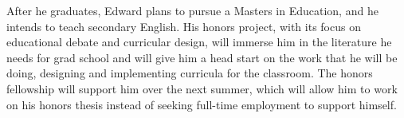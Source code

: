 \documentclass[doc,12pt]{apa6}
\begin{document}
After he graduates, Edward plans to pursue a Masters in Education, and he
intends to teach secondary English. His honors project, with its focus on
educational debate and curricular design, will immerse him in the literature he
needs for grad school and will give him a head start on the work that he will
be doing, designing and implementing curricula for the classroom. The honors
fellowship will support him over the next summer, which will allow him to work
on his honors thesis instead of seeking full-time employment to support
himself.
\end{document}
